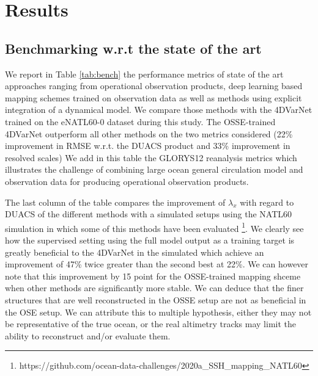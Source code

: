 \documentclass[draft]{agujournal2019}
\begin{document}
\section{Results}
\label{sec:results}

\subsection{Benchmarking w.r.t the state of the art}
\label{ssec:benchmarks}

We report in Table \ref{tab:bench} the performance metrics of state of the art approaches ranging from operational observation products, deep learning based mapping schemes trained on observation data as well as methods using explicit integration of a dynamical model.
We compare those methods with the 4DVarNet trained on the eNATL60-0 dataset during this study. 
The OSSE-trained 4DVarNet outperform all other methods on the two metrics considered (22\% improvement in RMSE w.r.t. the DUACS product and 33\% improvement in resolved scales)
We add in this table the GLORYS12 reanalysis metrics which illustrates the challenge of combining large ocean general circulation model and observation data for producing operational observation products.


The last column of the table compares the improvement of $\lambda_x$ with regard to DUACS of the different methods with a simulated setups using the NATL60 simulation in which some of this methods have been evaluated \footnote{https://github.com/ocean-data-challenges/2020a\_SSH\_mapping\_NATL60}. We clearly see how the supervised setting using the full model output as a training target is greatly beneficial to the 4DVarNet in the simulated which achieve an improvement of 47\% twice greater than the second best at 22\%. We can however note that this improvement by 15 point for the OSSE-trained mapping shceme when other methods are significantly more stable. We can deduce that the finer structures that are well reconstructed in the OSSE setup are not as beneficial in the OSE setup. We can attribute this to multiple hypothesis, either they may not be representative of the true ocean, or the real altimetry tracks may limit the ability to reconstruct and/or evaluate them.  
\end{document}
